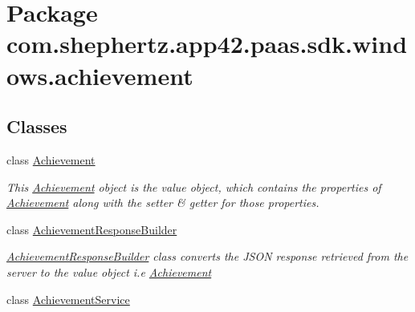 \hypertarget{namespacecom_1_1shephertz_1_1app42_1_1paas_1_1sdk_1_1windows_1_1achievement}{\section{Package com.\+shephertz.\+app42.\+paas.\+sdk.\+windows.\+achievement}
\label{namespacecom_1_1shephertz_1_1app42_1_1paas_1_1sdk_1_1windows_1_1achievement}
}
\subsection*{Classes}
\begin{DoxyCompactItemize}
\item 
class \hyperlink{classcom_1_1shephertz_1_1app42_1_1paas_1_1sdk_1_1windows_1_1achievement_1_1_achievement}{Achievement}
\begin{DoxyCompactList}\small\item\em This \hyperlink{classcom_1_1shephertz_1_1app42_1_1paas_1_1sdk_1_1windows_1_1achievement_1_1_achievement}{Achievement} object is the value object, which contains the properties of \hyperlink{classcom_1_1shephertz_1_1app42_1_1paas_1_1sdk_1_1windows_1_1achievement_1_1_achievement}{Achievement} along with the setter \& getter for those properties. \end{DoxyCompactList}\item 
class \hyperlink{classcom_1_1shephertz_1_1app42_1_1paas_1_1sdk_1_1windows_1_1achievement_1_1_achievement_response_builder}{Achievement\+Response\+Builder}
\begin{DoxyCompactList}\small\item\em \hyperlink{classcom_1_1shephertz_1_1app42_1_1paas_1_1sdk_1_1windows_1_1achievement_1_1_achievement_response_builder}{Achievement\+Response\+Builder} class converts the J\+S\+O\+N response retrieved from the server to the value object i.\+e \hyperlink{classcom_1_1shephertz_1_1app42_1_1paas_1_1sdk_1_1windows_1_1achievement_1_1_achievement}{Achievement} \end{DoxyCompactList}\item 
class \hyperlink{classcom_1_1shephertz_1_1app42_1_1paas_1_1sdk_1_1windows_1_1achievement_1_1_achievement_service}{Achievement\+Service}
\end{DoxyCompactItemize}
